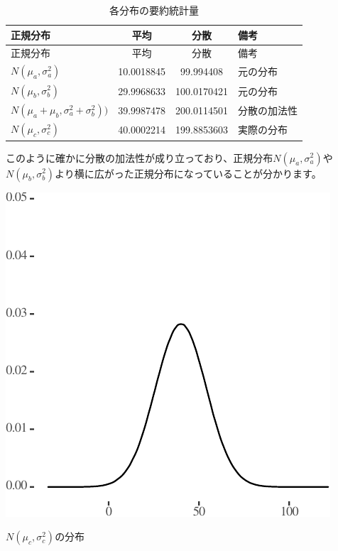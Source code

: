 \documentclass[]{tufte-handout}
\begin{document}
\begin{longtable}[]{@{}lccl@{}}
\caption{各分布の要約統計量}\tabularnewline
\toprule
正規分布 & 平均 & 分散 & 備考 \\
\midrule
\endfirsthead
\toprule
正規分布 & 平均 & 分散 & 備考 \\
\midrule
\endhead
\(N(\mu_a, \sigma^2_a)\) & 10.0018845 & 99.994408 & 元の分布 \\
\(N(\mu_b, \sigma^2_b)\) & 29.9968633 & 100.0170421 & 元の分布 \\
\(N(\mu_a + \mu_b, \sigma^2_a + \sigma^2_b))\) & 39.9987478 &
200.0114501 & 分散の加法性 \\
\(N(\mu_c, \sigma^2_c)\) & 40.0002214 & 199.8853603 & 実際の分布 \\
\bottomrule
\end{longtable}

このように確かに分散の加法性が成り立っており、正規分布\(N(\mu_a, \sigma^2_a)\)や\(N(\mu_b,\sigma^2_b)\)より横に広がった正規分布になっていることが分かります。

\begin{marginfigure}

{\centering \includegraphics{AdditivityOfVariance_files/figure-latex/unnamed-chunk-5-1} 

}

\caption[$N(\mu_c, \sigma^2_c)$の分布]{$N(\mu_c, \sigma^2_c)$の分布}\label{fig:unnamed-chunk-5}
\end{marginfigure}
\end{document}
